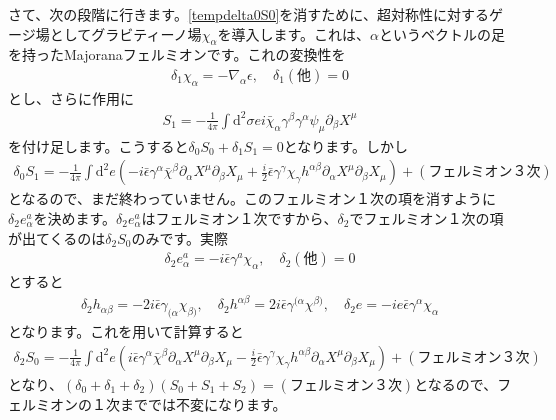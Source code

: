 \documentclass[report,paper=a4, fontsize=12pt, line_length=16cm, number_of_lines=33,dvipdfmx]{jlreq}
\numberwithin{equation}{chapter}
\numberwithin{equation}{section}
\newcommand{\del}{\partial}
\newcommand{\di}{\mathrm{d}}
\newcommand{\chib}{\bar{\chi}}
\newcommand{\epsilonb}{\bar{\epsilon}}
\begin{document}
さて、次の段階に行きます。\eqref{tempdelta0S0}を消すために、超対称性に対するゲージ場としてグラビティーノ場$\chi_{\alpha}$を導入します。これは、$\alpha$というベクトルの足を持ったMajoranaフェルミオンです。これの変換性を
\begin{align}
  \delta_{1}\chi_{\alpha}=-\nabla_{\alpha}\epsilon,\quad \delta_{1}(\text{他})=0
\end{align}
とし、さらに作用に
\begin{align}
  S_1=-\frac{1}{4\pi}\int \di^2 \sigma e i
  \chib_{\alpha}\gamma^{\beta}\gamma^{\alpha}\psi_{\mu}\del_{\beta}X^{\mu}
\end{align}
を付け足します。こうすると$\delta_{0}S_0+\delta_{1}S_1=0$となります。しかし
\begin{align}
  \delta_{0}S_1=-\frac{1}{4\pi}\int \di^2 e\left(-i\epsilonb \gamma^{\alpha}\chib^{\beta}\del_{\alpha}X^{\mu}\del_{\beta}X_{\mu}+\frac{i}{2}\epsilonb \gamma^{\gamma}\chi_{\gamma}h^{\alpha\beta}\del_{\alpha}X^{\mu}\del_{\beta}X_{\mu}  \right)+(\text{フェルミオン３次})
\end{align}
となるので、まだ終わっていません。このフェルミオン１次の項を消すように$\delta_{2}e^{a}_{\alpha}$を決めます。$\delta_{2}e^{a}_{\alpha}$はフェルミオン１次ですから、$\delta_2$でフェルミオン１次の項が出てくるのは$\delta_2 S_0$のみです。実際
\begin{align}
  \delta_2 e^{a}_{\alpha}=-i\epsilonb \gamma^{a}\chi_{\alpha},\quad
  \delta_2 (\text{他})=0
\end{align}
とすると
\begin{align}
  \delta_2 h_{\alpha\beta}=-2i\epsilonb \gamma_{(\alpha}\chi_{\beta)},\quad
  \delta_2 h^{\alpha\beta}=2i\epsilonb \gamma^{(\alpha}\chi^{\beta)},\quad
  \delta_2 e = -ie \epsilonb \gamma^{\alpha}\chi_{\alpha}
\end{align}
となります。これを用いて計算すると
\begin{align}
  \delta_2 S_0=-\frac{1}{4\pi}\int \di^2 e\left(i\epsilonb \gamma^{\alpha}\chib^{\beta}\del_{\alpha}X^{\mu}\del_{\beta}X_{\mu}-\frac{i}{2}\epsilonb \gamma^{\gamma}\chi_{\gamma}h^{\alpha\beta}\del_{\alpha}X^{\mu}\del_{\beta}X_{\mu}  \right)+(\text{フェルミオン３次})
\end{align}
となり、$(\delta_0+\delta_1+\delta_2)(S_0+S_1+S_2)=(\text{フェルミオン３次})$となるので、フェルミオンの１次まででは不変になります。
\end{document}
